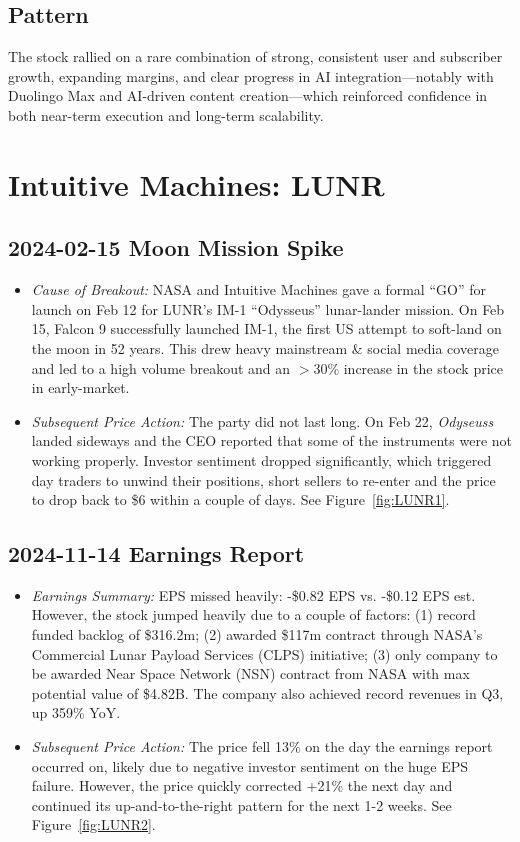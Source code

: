 \documentclass[11pt]{article}
\begin{document}
    \subsection{Pattern}
        The stock rallied on a rare combination of strong, consistent user and subscriber growth, expanding margins, and clear progress in AI integration—notably with Duolingo Max and AI-driven content creation—which reinforced confidence in both near-term execution and long-term scalability.  
\section{Intuitive Machines: LUNR}
    \subsection{2024-02-15 Moon Mission Spike}
        \begin{itemize}
            \item \textit{Cause of Breakout:} NASA and Intuitive Machines gave a formal ``GO'' for launch on Feb 12 for LUNR's IM-1 ``Odysseus'' lunar-lander mission. On Feb 15, Falcon 9 successfully launched IM-1, the first US attempt to soft-land on the moon in 52 years. This drew heavy mainstream \& social media coverage and led to a high volume breakout and an $>$30\% increase in the stock price in early-market.
            \item \textit{Subsequent Price Action:} The party did not last long. On Feb 22, \textit{Odyseuss} landed sideways and the CEO reported that some of the instruments were not working properly. Investor sentiment dropped significantly, which triggered day traders to unwind their positions, short sellers to re-enter and the price to drop back to \$6 within a couple of days. See Figure~\ref{fig:LUNR1}.
        \end{itemize}
    \subsection{2024-11-14 Earnings Report}
        \begin{itemize}
            \item \textit{Earnings Summary:} EPS missed heavily: -\$0.82 EPS vs. -\$0.12 EPS est. However, the stock jumped heavily due to a couple of factors: (1) record funded backlog of \$316.2m; (2) awarded \$117m contract through NASA's Commercial Lunar Payload Services (CLPS) initiative; (3) only company to be awarded Near Space Network (NSN) contract from NASA with max potential value of \$4.82B. The company also achieved record revenues in Q3, up 359\% YoY.
            \item \textit{Subsequent Price Action:} The price fell 13\% on the day the earnings report occurred on, likely due to negative investor sentiment on the huge EPS failure. However, the price quickly corrected +21\% the next day and continued its up-and-to-the-right pattern for the next 1-2 weeks. See Figure~\ref{fig:LUNR2}.
        \end{itemize}
\end{document}
